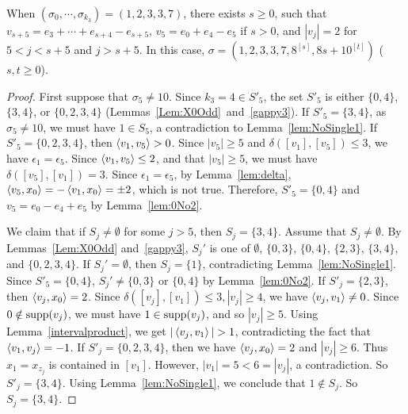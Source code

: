 \begin{prop}\label{lem:k1=2,2t+3}
When $(\sigma_0, \cdots, \sigma_{k_3})=(1,2,3,3,7)$, there exists $s\ge0$, such that $v_{s+5}=e_{3}+\cdots +e_{s+4}-e_{s+5}$, $v_5 = e_0 + e_4-e_5$ if $s>0$, and $|v_j|=2$ for $5<j<s+5$ and $j>s+5$. In this case, $\sigma =  (1,2,3,3,7,8^{[s]}, 8s+10^{[t]})$ ($s,t\geq 0$).
\end{prop}	
\begin{proof}
First suppose that $\sigma_5\neq 10$.
Since $k_3=4\in S'_5$, the set $S'_5$ is either $\{0,4\}$, $\{3,4\}$, or $\{0,2,3,4\}$ (Lemmas~\ref{Lem:X0Odd}~and~\ref{gappy3}). 
If $S'_5=\{3,4\}$, as $\sigma_5\neq 10$, we must have $1\in S_5$, a contradiction to Lemma~\ref{lem:NoSingle1}. If $S'_5=\{0,2,3,4\}$, then $\left\langle v_1 , v_5 \right\rangle> 0$. Since $|v_5|\ge 5$ and $\delta([v_1], [v_5])\le 3$, we have $\epsilon_1=\epsilon_5$. Since $\left\langle v_1 , v_5 \right\rangle\le2$, and that $|v_5|\ge 5$, we must have $\delta([v_5],[v_1])=3$. Since $\epsilon_1=\epsilon_5$, by Lemma~\ref{lem:delta}, $\left\langle v_5 , x_0 \right\rangle=-\left\langle v_1 , x_0 \right\rangle=\pm2$, which is not true. Therefore, $S'_5=\{ 0, 4\}$ and $v_5=e_0-e_4+e_5$ by Lemma~\ref{lem:0No2}.




We claim that if $S_j\ne\emptyset$ for some $j>5$, then $S_j=\{3,4\}$. Assume that $S_j\ne\emptyset$.
By Lemmas~\ref{Lem:X0Odd} and~\ref{gappy3}, $S_j'$ is one of $\emptyset$, $\{0,3\}$, $\{ 0,4\}$, $\{2, 3\}$, $\{ 3,4\}$, and $\{ 0,2, 3,4\}$. If $S_j'=\emptyset$, then $S_j=\{1\}$, contradicting Lemma~\ref{lem:NoSingle1}. Since $S'_5=\{ 0, 4\}$, $S_j'\ne\{0,3\}$ or $\{0,4\}$ by Lemma~\ref{lem:0No2}.
If $S'_j=\{ 2,3\}$, then $\left\langle v_j , x_0 \right\rangle=2$. Since $\delta([v_j], [v_1])\le 3, |v_j|\ge 4$, we have $\left\langle v_j , v_1 \right\rangle\ne0$. Since
$0\notin \operatorname{supp}(v_j)$, we must have $1\in \operatorname{supp}(v_j)$, and so $|v_j|\ge 5$. Using Lemma~\ref{intervalproduct}, we get $|\braket{v_j}{v_1}|>1$, contradicting the fact that $\left\langle v_1 , v_j \right\rangle=-1$. If $S'_{j} = \{0,2,3,4\}$, then we have $\left\langle v_{j} , x_0 \right\rangle=2$ and $|v_{j}|\ge 6$. Thus $x_1=x_{z_j}$ is contained in $[v_1]$. However, $|v_1|=5<6=|v_j|$, a contradiction. So $S'_j=\{3,4\}$. Using Lemma~\ref{lem:NoSingle1}, we conclude that $1\notin S_j$. So $S_j=\{3,4\}$. 


\end{proof}
